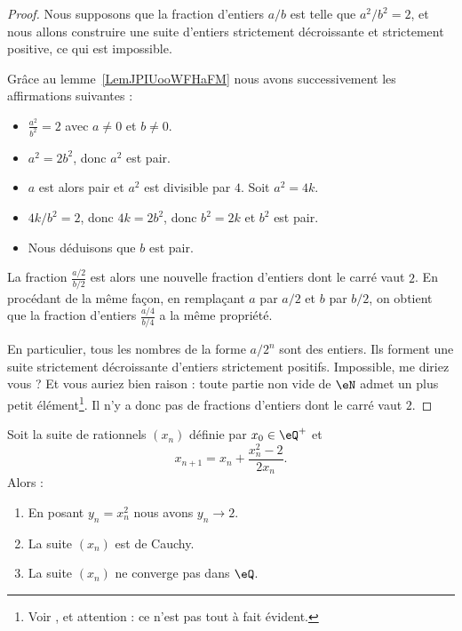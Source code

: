 \begin{proof}
    Nous supposons que la fraction d'entiers \( a/b\) est telle que \( a^2/b^2=2\), et nous allons construire une suite d'entiers strictement décroissante et strictement positive, ce qui est impossible.

    Grâce au lemme~\ref{LemJPIUooWFHaFM} nous avons successivement les affirmations suivantes :
    \begin{itemize}
        \item
        \(\frac{ a^2 }{ b^2 }=2 \)  avec \( a\neq 0\) et \( b\neq 0\).
    \item
        \( a^2=2b^2\), donc \( a^2\) est pair.
    \item
        \( a\) est alors pair et \( a^2\) est divisible par \( 4\). Soit \( a^2=4k\).
    \item
        \( 4k/b^2=2\), donc \( 4k=2b^2\), donc \( b^2=2k\) et \( b^2\) est pair.
    \item
        Nous déduisons que \( b\) est pair.
    \end{itemize}
    La fraction \( \frac{ a/2 }{ b/2 }\) est alors une nouvelle fraction d'entiers dont le carré vaut $2$. En procédant de la même façon, en remplaçant \( a\) par \( a/2\) et \( b\) par \( b/2\), on obtient que la fraction d'entiers \( \frac{ a/4 }{ b/4 }\) a la même propriété.

    En particulier, tous les nombres de la forme \( a/2^n\) sont des entiers.  Ils forment une suite strictement décroissante d'entiers strictement positifs. Impossible, me diriez vous ? Et vous auriez bien raison : toute partie non vide de \( \eN\) admet un plus petit élément\footnote{Voir \cite{RWWJooJdjxEK}, et attention : ce n'est pas tout à fait évident.}. Il n'y a donc pas de fractions d'entiers dont le carré vaut \( 2\).
\end{proof}

\begin{proposition}      \label{PROPooAHMIooVpunrF}
    Soit la suite de rationnels \( (x_n)\) définie par \( x_0\in \eQ^+\) et
    \begin{equation}
        x_{n+1}=x_n+\frac{ x_n^2-2 }{ 2x_n }.
    \end{equation}
    Alors :
    \begin{enumerate}
        \item
            En posant \( y_n=x_n^2\) nous avons \( y_n\to 2\).
        \item
            La suite \( (x_n)\) est de Cauchy.
        \item
            La suite \( (x_n)\) ne converge pas dans \( \eQ\).
    \end{enumerate}
\end{proposition}

